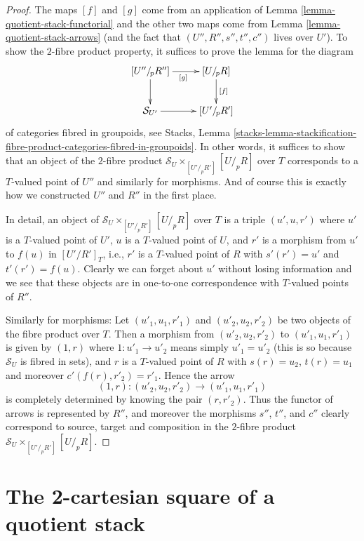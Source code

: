 \begin{proof}
The maps $[f]$ and $[g]$ come from an application of
Lemma \ref{lemma-quotient-stack-functorial}
and the other two maps come from
Lemma \ref{lemma-quotient-stack-arrows}
(and the fact that $(U'', R'', s'', t'', c'')$ lives over $U'$).
To show the $2$-fibre product property, it suffices to prove the lemma
for the diagram
$$
\xymatrix{
[U''/_{\!p}R''] \ar[d] \ar[r]_{[g]} & [U/_{\!p}R] \ar[d]^{[f]} \\
\mathcal{S}_{U'} \ar[r] & [U'/_{\!p}R']
}
$$
of categories fibred in groupoids, see
Stacks, Lemma
\ref{stacks-lemma-stackification-fibre-product-categories-fibred-in-groupoids}.
In other words, it suffices to show that an object of the $2$-fibre product
$\mathcal{S}_U \times_{[U'/_{\!p}R']} [U/_{\!p}R]$ over $T$ corresponds
to a $T$-valued point of $U''$ and similarly for morphisms. And of course
this is exactly how we constructed $U''$ and $R''$ in the first place.

\medskip\noindent
In detail, an object of $\mathcal{S}_U \times_{[U'/_{\!p}R']} [U/_{\!p}R]$
over $T$ is a triple $(u', u, r')$ where $u'$ is a $T$-valued point of $U'$,
$u$ is a $T$-valued point of $U$, and $r'$ is a morphism from $u'$ to
$f(u)$ in $[U'/R']_T$, i.e., $r'$ is a $T$-valued point of $R$ with
$s'(r') = u'$ and $t'(r') = f(u)$. Clearly we can forget about $u'$
without losing information and we see that these objects are in one-to-one
correspondence with $T$-valued points of $R''$.

\medskip\noindent
Similarly for morphisms: Let $(u'_1, u_1, r'_1)$ and $(u'_2, u_2, r'_2)$ be
two objects of the fibre product over $T$. Then a morphism from
$(u'_2, u_2, r'_2)$ to $(u'_1, u_1, r'_1)$
is given by $(1, r)$ where $1 : u'_1 \to u'_2$ means simply $u'_1 = u'_2$
(this is so because $\mathcal{S}_U$ is fibred in sets), and $r$ is a
$T$-valued point of $R$ with $s(r) = u_2$, $t(r) = u_1$ and moreover
$c'(f(r), r'_2) = r'_1$. Hence the arrow
$$
(1, r) : (u'_2, u_2, r'_2) \to (u'_1, u_1, r'_1)
$$
is completely determined by knowing the pair $(r, r'_2)$. Thus the functor
of arrows is represented by $R''$, and moreover the morphisms $s''$, $t''$,
and $c''$ clearly correspond to source, target and composition in
the $2$-fibre product $\mathcal{S}_U \times_{[U'/_{\!p}R']} [U/_{\!p}R]$.
\end{proof}







\section{The 2-cartesian square of a quotient stack}
\label{section-quotient-stack-2-cartesian}

